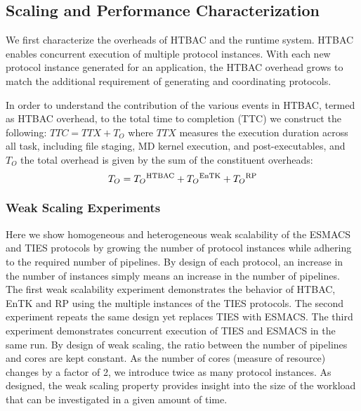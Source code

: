 \subsection{Scaling and Performance Characterization}

We first characterize the overheads of HTBAC and the runtime system. HTBAC
enables concurrent execution of multiple protocol instances. With each new
protocol instance generated for an application, the HTBAC overhead grows to
match the additional requirement of generating and coordinating protocols.

In order to understand the contribution of the various events in HTBAC, termed
as HTBAC overhead, to the total time to completion (TTC) we construct the
following: $TTC = TTX + T_{O}$ where
 \(TTX\) measures the execution duration across all task, including file
 staging, MD kernel execution, and post-executables, and $T_{O}$ the total
overhead is given by the sum of the constituent overheads: $$T_{O} =
T_{O}\textsuperscript{HTBAC} + T_{O}\textsuperscript{EnTK} +
T_{O}\textsuperscript{RP}$$









\subsubsection{Weak Scaling Experiments}

Here we show homogeneous and heterogeneous weak scalability of the ESMACS 
and TIES protocols by growing the number of protocol instances while adhering 
to the required number of pipelines. By design of each protocol, an 
increase in the number of instances simply means an increase in the number of 
pipelines. The first weak scalability experiment demonstrates the 
behavior of HTBAC, EnTK and RP using the multiple instances
of the TIES protocols. The second experiment repeats the same design yet replaces
TIES with ESMACS. The third experiment demonstrates concurrent execution of TIES
and ESMACS in the same run. By design of weak scaling, the ratio between the 
number of pipelines and cores are kept constant. As the number of cores 
(measure of resource) changes by a factor of 2, we introduce twice as many 
protocol instances. As designed, the weak scaling property provides insight 
into the size of the workload that can be investigated in a given amount of time.

